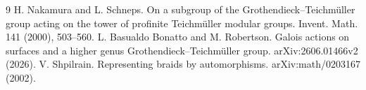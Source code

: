 \documentclass[11pt,a4paper]{article}
\begin{document}

\begin{thebibliography}{9}
 H. Nakamura and L. Schneps. On a subgroup of the Grothendieck--Teichm\"uller group acting on the tower of profinite Teichm\"uller modular groups. Invent. Math. 141 (2000), 503--560.
 L. Basualdo Bonatto and M. Robertson. Galois actions on surfaces and a higher genus Grothendieck--Teichm\"uller group. arXiv:2606.01466v2 (2026).
 V. Shpilrain. Representing braids by automorphisms. arXiv:math/0203167 (2002).
\end{thebibliography}
\end{document}
